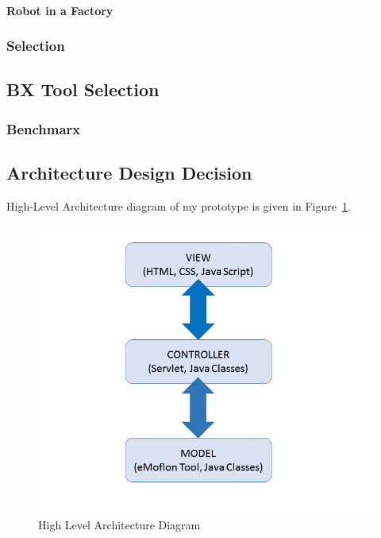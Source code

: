 \paragraph{Robot in a Factory}

\subsubsection{Selection}\label{subsubsec:exampleselection}

\subsection{BX Tool Selection}\label{subsec:bxtoolselection}

\subsubsection{Benchmarx}\label{subsubsec:benchmarx}

\subsection{Architecture Design Decision}\label{subsec:architecturedesign}
High-Level Architecture diagram of my prototype is given in Figure~\ref{fig:Architecture_Diagram}.
\begin{figure}
	\includegraphics[width=1\textwidth]{figures/Highlevel_Arch}
	\caption{High Level Architecture Diagram}
	\label{fig:Architecture_Diagram}
\end{figure}
